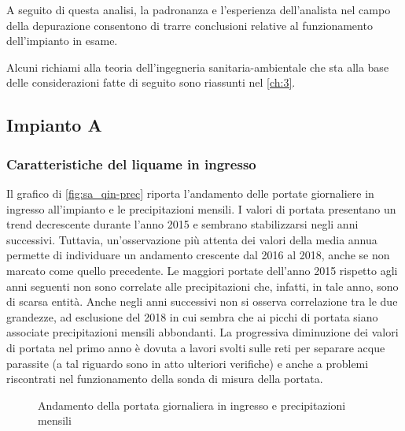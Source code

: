 A seguito di questa analisi, la padronanza e l'esperienza dell'analista nel campo della depurazione consentono di trarre conclusioni relative al funzionamento dell'impianto in esame.

Alcuni richiami alla teoria dell'ingegneria sanitaria-ambientale che sta alla base delle considerazioni fatte di seguito sono riassunti nel \autoref{ch:3}.


\subsection{Impianto A}
\subsubsection{Caratteristiche del liquame in ingresso}

Il grafico di \autoref{fig:sa_qin-prec} riporta l’andamento delle portate giornaliere in ingresso all’impianto e le precipitazioni mensili.
I valori di portata presentano un trend decrescente durante l’anno 2015 e sembrano stabilizzarsi negli anni successivi. Tuttavia, un’osservazione più attenta dei valori della media annua permette di individuare un andamento crescente dal 2016 al 2018, anche se non marcato come quello precedente.  
Le maggiori portate dell’anno 2015 rispetto agli anni seguenti non sono correlate alle precipitazioni che, infatti, in tale anno, sono di scarsa entità. Anche negli anni successivi non si osserva correlazione tra le due grandezze, ad esclusione del 2018 in cui sembra che ai picchi di portata siano associate precipitazioni mensili abbondanti.
La progressiva diminuzione dei valori di portata nel primo anno è dovuta a lavori svolti sulle reti per separare acque parassite (a tal riguardo sono in atto ulteriori verifiche) e anche a problemi riscontrati nel funzionamento della sonda di misura della portata.
\begin{figure}
	\centering
	\caption{Andamento della portata giornaliera in ingresso e  precipitazioni mensili}
	\label{fig:sa_qin-prec}
\end{figure}

